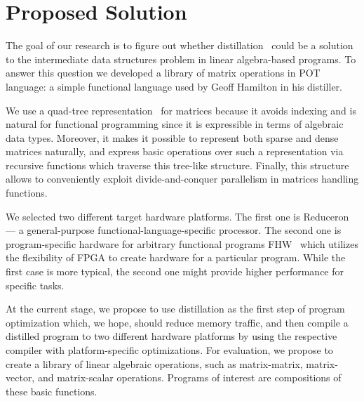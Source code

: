 \section{Proposed Solution}

The goal of our research is to figure out whether distillation~\cite{hamilton2021700} could be a solution to the intermediate data structures problem in linear algebra-based programs.
To answer this question we developed a library of matrix operations in POT language: a simple functional language used by Geoff Hamilton in his distiller.  

We use a quad-tree representation~\cite{qtree} for matrices because it avoids indexing and is natural for functional programming since it is expressible in terms of algebraic data types.
Moreover, it makes it possible to represent both sparse and dense matrices naturally, and express basic operations over such a representation via recursive functions which traverse this tree-like structure.
Finally, this structure allows to conveniently exploit divide-and-conquer parallelism in matrices handling functions.

We selected two different target hardware platforms.
The first one is Reduceron~\cite{naylorRunciman2012} --- a general-purpose functional-language-specific processor.
The second one is program-specific hardware for arbitrary functional programs FHW~\cite{Edwards2019FHWP} which utilizes the flexibility of FPGA to create hardware for a particular program.
While the first case is more typical, the second one might provide higher performance for specific tasks.

At the current stage, we propose to use distillation as the first step of program optimization which, we hope, should reduce memory traffic, and then compile a distilled program to two different hardware platforms by using the respective compiler with platform-specific optimizations.
For evaluation, we propose to create a library of linear algebraic operations, such as matrix-matrix, matrix-vector, and matrix-scalar operations.
Programs of interest are compositions of these basic functions.